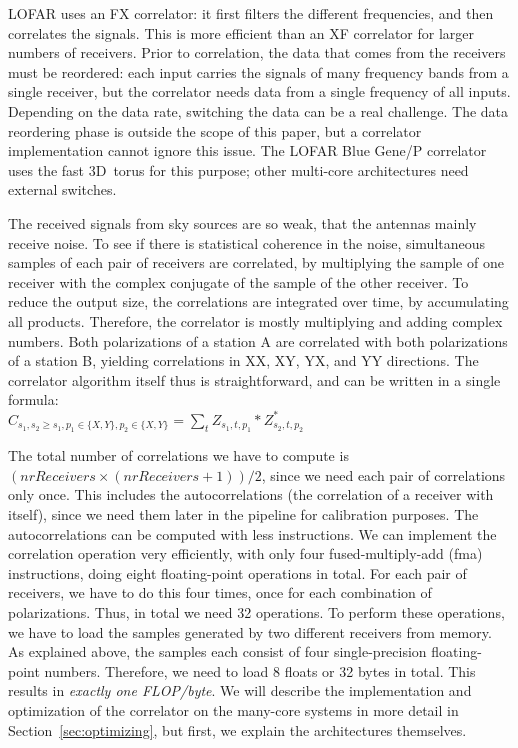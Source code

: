 \documentclass{article}
\begin{document}
LOFAR uses an FX correlator: it first filters the different frequencies, and
then correlates the signals. This is more efficient than an XF correlator for larger numbers of receivers.
Prior to correlation, the data that comes from
the receivers must be reordered:
each input carries the signals of many frequency bands from a single
receiver, but the correlator needs data from a single frequency of all inputs.
Depending on the data rate, switching the data can be a real challenge.
The data reordering phase is outside the scope of this paper, but a correlator
implementation cannot ignore this issue.
The LOFAR Blue Gene/P correlator uses the fast 3D~torus for this purpose;
other multi-core architectures need external switches.


The received signals from sky sources are so weak, that the antennas 
mainly receive noise. To see if there is statistical coherence
in the noise, simultaneous samples of each pair of receivers are correlated, 
by multiplying the sample of one receiver with the complex
conjugate of the sample of the other receiver.
To reduce the output size, the correlations are integrated over time, by accumulating all products. 
Therefore, the correlator is mostly multiplying and adding complex numbers.
Both polarizations of a station A are correlated with both polarizations 
of a station B, yielding correlations in XX, XY, YX, and YY
directions.
The correlator algorithm itself thus is straightforward, and can be
written in a single formula: \\
$C_{s_1,s_2\geq s_1,p_1\in\{X,Y\},p_2\in\{X,Y\}} = \displaystyle\sum_{t} Z_{s_1,t,p_1} * Z_{s_2,t,p_2}^\ast$ 

The total number of correlations we have to compute is $(nrReceivers \times
(nrReceivers + 1)) / 2$, since we need each pair of correlations only
once. This includes the autocorrelations (the correlation of a receiver with itself),
since we need them later in the pipeline for calibration purposes.
The autocorrelations can be computed with less instructions.
We can implement the correlation operation very efficiently, with only
four fused-multiply-add (fma) instructions, doing eight floating-point
operations in total. For each pair of receivers, we have to do this
four times, once for each combination of polarizations. Thus, in total
we need 32 operations. To perform these operations, we have to load
the samples generated by two different receivers from memory.  As
explained above, the samples each consist of four single-precision
floating-point numbers.  Therefore, we need to load 8 floats or 32 bytes in
total.  This results in \emph{exactly one FLOP/byte}. 
We will describe the implementation and optimization of the correlator on the
many-core systems in more detail in Section~\ref{sec:optimizing}, but first, we explain the architectures themselves. 
\end{document}
